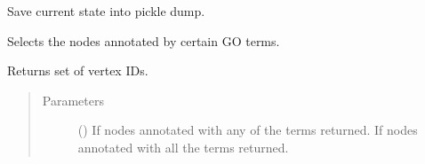 \documentclass[letterpaper,10pt,english]{sphinxmanual}
\begin{document}
\begin{fulllineitems}
\begin{fulllineitems}
\begin{quote}
\begin{description}
\end{description}\end{quote}

\end{fulllineitems}


\begin{fulllineitems}
\label{\detokenize{main:pypath.main.PyPath.save_session}}
Save current state into pickle dump.

\end{fulllineitems}


\begin{fulllineitems}
\label{\detokenize{main:pypath.main.PyPath.search_attr_and}}
\end{fulllineitems}


\begin{fulllineitems}
\label{\detokenize{main:pypath.main.PyPath.search_attr_or}}
\end{fulllineitems}


\begin{fulllineitems}
\label{\detokenize{main:pypath.main.PyPath.second_neighbours}}
\end{fulllineitems}


\begin{fulllineitems}
\label{\detokenize{main:pypath.main.PyPath.select_by_go}}
Selects the nodes annotated by certain GO terms.

Returns set of vertex IDs.
\begin{quote}\begin{description}
\item[{Parameters}] \leavevmode
{} () \textendash{} If  nodes annotated with any of the terms returned.
If  nodes annotated with all the terms returned.


\end{description}
\end{quote}
\end{fulllineitems}
\end{fulllineitems}
\end{document}
